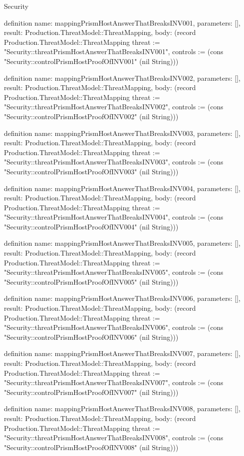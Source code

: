 \begin{lexlean}{Security}
\begin{semanticmodule}
definition{
  name: mappingPrismHostAnswerThatBreaksINV001,
  parameters: [],
  result: Production.ThreatModel::ThreatMapping,
  body: (record Production.ThreatModel::ThreatMapping {threat := "Security::threatPrismHostAnswerThatBreaksINV001", controls := (cons "Security::controlPrismHostProofOfINV001" (nil String))})
}

definition{
  name: mappingPrismHostAnswerThatBreaksINV002,
  parameters: [],
  result: Production.ThreatModel::ThreatMapping,
  body: (record Production.ThreatModel::ThreatMapping {threat := "Security::threatPrismHostAnswerThatBreaksINV002", controls := (cons "Security::controlPrismHostProofOfINV002" (nil String))})
}

definition{
  name: mappingPrismHostAnswerThatBreaksINV003,
  parameters: [],
  result: Production.ThreatModel::ThreatMapping,
  body: (record Production.ThreatModel::ThreatMapping {threat := "Security::threatPrismHostAnswerThatBreaksINV003", controls := (cons "Security::controlPrismHostProofOfINV003" (nil String))})
}

definition{
  name: mappingPrismHostAnswerThatBreaksINV004,
  parameters: [],
  result: Production.ThreatModel::ThreatMapping,
  body: (record Production.ThreatModel::ThreatMapping {threat := "Security::threatPrismHostAnswerThatBreaksINV004", controls := (cons "Security::controlPrismHostProofOfINV004" (nil String))})
}

definition{
  name: mappingPrismHostAnswerThatBreaksINV005,
  parameters: [],
  result: Production.ThreatModel::ThreatMapping,
  body: (record Production.ThreatModel::ThreatMapping {threat := "Security::threatPrismHostAnswerThatBreaksINV005", controls := (cons "Security::controlPrismHostProofOfINV005" (nil String))})
}

definition{
  name: mappingPrismHostAnswerThatBreaksINV006,
  parameters: [],
  result: Production.ThreatModel::ThreatMapping,
  body: (record Production.ThreatModel::ThreatMapping {threat := "Security::threatPrismHostAnswerThatBreaksINV006", controls := (cons "Security::controlPrismHostProofOfINV006" (nil String))})
}

definition{
  name: mappingPrismHostAnswerThatBreaksINV007,
  parameters: [],
  result: Production.ThreatModel::ThreatMapping,
  body: (record Production.ThreatModel::ThreatMapping {threat := "Security::threatPrismHostAnswerThatBreaksINV007", controls := (cons "Security::controlPrismHostProofOfINV007" (nil String))})
}

definition{
  name: mappingPrismHostAnswerThatBreaksINV008,
  parameters: [],
  result: Production.ThreatModel::ThreatMapping,
  body: (record Production.ThreatModel::ThreatMapping {threat := "Security::threatPrismHostAnswerThatBreaksINV008", controls := (cons "Security::controlPrismHostProofOfINV008" (nil String))})
}


\end{semanticmodule}
\end{lexlean}
